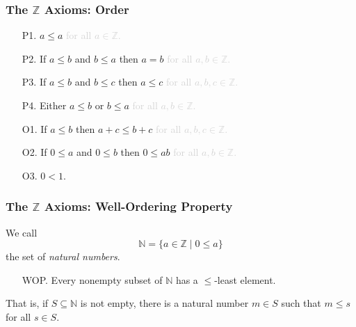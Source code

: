 \documentclass{beamer}
\begin{document}
\begin{frame}
\frametitle{The $\mathbb{Z}$ Axioms: Order}
\begin{itemize}
\item[P1.] $a \leq a$ \textcolor{lightgray}{for all $a \in \mathbb{Z}$.} \pause
\item[P2.] If $a \leq b$ and $b \leq a$ then $a = b$ \textcolor{lightgray}{for all $a,b \in \mathbb{Z}$.} \pause
\item[P3.] If $a \leq b$ and $b \leq c$ then $a \leq c$ \textcolor{lightgray}{for all $a,b,c \in \mathbb{Z}$.} \pause
\item[P4.] Either $a \leq b$ or $b \leq a$ \textcolor{lightgray}{for all $a,b \in \mathbb{Z}$.} \pause
\item[O1.] If $a \leq b$ then $a+c \leq b+c$ \textcolor{lightgray}{for all $a,b,c \in \mathbb{Z}$.} \pause
\item[O2.] If $0 \leq a$ and $0 \leq b$ then $0 \leq ab$ \textcolor{lightgray}{for all $a,b \in \mathbb{Z}$.} \pause
\item[O3.] $0 < 1$.
\end{itemize}
\end{frame}



\begin{frame}
\frametitle{The $\mathbb{Z}$ Axioms: Well-Ordering Property}

We call \[\mathbb{N} = \{a \in \mathbb{Z} \mid 0 \leq a\}\] the set of \emph{natural numbers}. \pause

\vspace{1cm}

\begin{itemize}
\item[WOP.] Every nonempty subset of $\mathbb{N}$ has a $\leq$-least element. \pause
\end{itemize}

\vspace{1cm}

That is, if $S \subseteq \mathbb{N}$ is not empty, there is a natural number $m \in S$ such that $m \leq s$ for all $s \in S$.
\end{frame}
\end{document}
